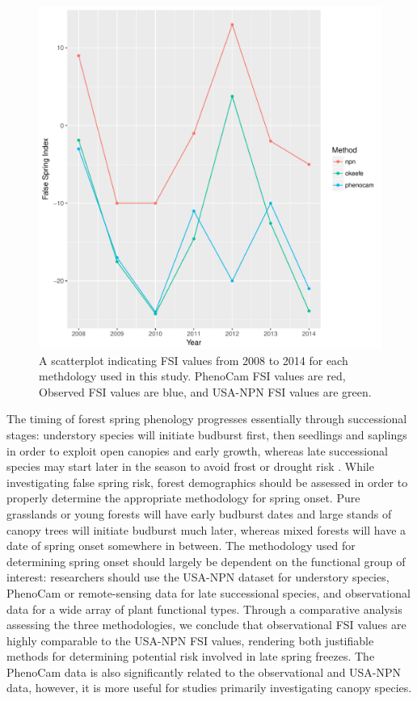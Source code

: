 \documentclass{article}\usepackage[]{graphicx}\usepackage[]{color}
\makeatletter
\def\maxwidth{ %
  \ifdim\Gin@nat@width>\linewidth
    \linewidth
  \else
    \Gin@nat@width
  \fi
}
\makeatother
\begin{document}
\begin{figure}[H]
\includegraphics[width=\maxwidth]{figure/fsifig-1} \caption[A scatterplot indicating FSI values from 2008 to 2014 for each methdology used in this study]{A scatterplot indicating FSI values from 2008 to 2014 for each methdology used in this study. PhenoCam FSI values are red, Observed FSI values are blue, and USA-NPN FSI values are green.}\label{fig:fsifig}
\end{figure}



The timing of forest spring phenology progresses essentially through successional stages: understory species will initiate budburst first, then seedlings and saplings in order to exploit open canopies and early growth, whereas late successional species may start later in the season to avoid frost or drought risk \citep{Xin2016, Richardson2009}. While investigating false spring risk, forest demographics should be assessed in order to properly determine the appropriate methodology for spring onset. Pure grasslands or young forests will have early budburst dates and large stands of canopy trees will initiate budburst much later, whereas mixed forests will have a date of spring onset somewhere in between. The methodology used for determining spring onset should largely be dependent on the functional group of interest: researchers should use the USA-NPN dataset for understory species, PhenoCam or remote-sensing data for late successional species, and observational data for a wide array of plant functional types. Through a comparative analysis assessing the three methodologies, we conclude that observational FSI values are highly comparable to the USA-NPN FSI values, rendering both justifiable methods for determining potential risk involved in late spring freezes. The PhenoCam data is also significantly related to the observational and USA-NPN data, however, it is more useful for studies primarily investigating canopy species. 
\end{document}
